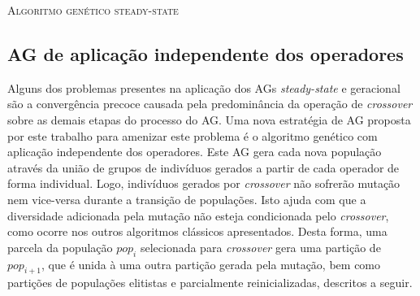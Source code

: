  
 \begin{algorithm}[!ht]
   \SetAlgoLined
   
   \caption{\textsc{Algoritmo genético steady-state}}\label{alg:gass}
 \end{algorithm}

\subsection{AG de aplicação independente dos operadores}
Alguns dos problemas presentes na aplicação dos AGs \textit{steady-state} e geracional são a convergência precoce causada pela predominância da operação de \textit{crossover} sobre as demais etapas do processo do AG. Uma nova estratégia de AG proposta por este trabalho para amenizar este problema é o algoritmo genético com aplicação independente dos operadores. Este AG gera cada nova população através da união de grupos de indivíduos gerados a partir de cada operador de forma individual. Logo, indivíduos gerados por \textit{crossover} não sofrerão mutação nem vice-versa durante a transição de populações. Isto ajuda com que a diversidade adicionada pela mutação não esteja condicionada pelo \textit{crossover}, como ocorre nos outros algoritmos clássicos apresentados. Desta forma, uma parcela da população $pop_i$ selecionada para \textit{crossover} gera uma partição de $pop_{i+1}$, que é unida à uma outra partição gerada pela mutação, bem como partições de populações elitistas e parcialmente reinicializadas, descritos a seguir.

